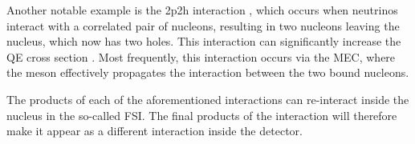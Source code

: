 Another notable example is the \gls{2p2h} interaction \cite{FirstUseOfMEC2009.pdf, FirstUseOfMEC2010.pdf, FirstUseOfMEC2011.pdf}, which occurs when neutrinos interact with a correlated pair of nucleons, resulting in two nucleons leaving the nucleus, which now has two holes. This interaction can significantly increase the \gls{QE} cross section \cite{NeutrinoIntOverview2022.pdf}. Most frequently, this interaction occurs via the \gls{MEC}, where the meson effectively propagates the interaction between the two bound nucleons.

The products of each of the aforementioned interactions can re-interact inside the nucleus in the so-called \gls{FSI}. The final products of the interaction will therefore make it appear as a different interaction inside the detector.



